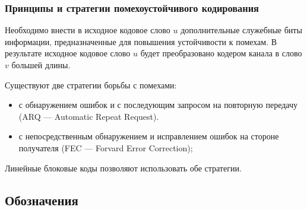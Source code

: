 \begin{frame}
    \frametitle{Принципы и стратегии помехоустойчивого кодирования}
    
    Необходимо внести в исходное кодовое слово $u$ дополнительные служебные биты информации, предназначенные для повышения устойчивости к помехам. В результате исходное кодовое слово $u$ будет преобразовано кодером канала в слово $v$ большей длины.
    
    Существуют две стратегии борьбы с помехами:
    \begin{itemize}
        \item с обнаружением ошибок и с последующим запросом на повторную передачу (ARQ --- Automatic Repeat Request).
    
        \item с непосредственным обнаружением и исправлением ошибок на стороне получателя (FEC --- Forvard Error Correction);        
    \end{itemize}
    Линейные блоковые коды позволяют использовать обе стратегии.
\end{frame}


\subsection{Обозначения}


